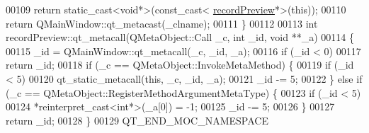 \begin{DoxyCode}
00109         \textcolor{keywordflow}{return} \textcolor{keyword}{static\_cast<}\textcolor{keywordtype}{void}*\textcolor{keyword}{>}(\textcolor{keyword}{const\_cast<} \hyperlink{a00020}{recordPreview}*\textcolor{keyword}{>}(\textcolor{keyword}{this}));
00110     \textcolor{keywordflow}{return} QMainWindow::qt\_metacast(\_clname);
00111 \}
00112 
00113 \textcolor{keywordtype}{int} recordPreview::qt\_metacall(QMetaObject::Call \_c, \textcolor{keywordtype}{int} \_id, \textcolor{keywordtype}{void} **\_a)
00114 \{
00115     \_id = QMainWindow::qt\_metacall(\_c, \_id, \_a);
00116     \textcolor{keywordflow}{if} (\_id < 0)
00117         \textcolor{keywordflow}{return} \_id;
00118     \textcolor{keywordflow}{if} (\_c == QMetaObject::InvokeMetaMethod) \{
00119         \textcolor{keywordflow}{if} (\_id < 5)
00120             qt\_static\_metacall(\textcolor{keyword}{this}, \_c, \_id, \_a);
00121         \_id -= 5;
00122     \} \textcolor{keywordflow}{else} \textcolor{keywordflow}{if} (\_c == QMetaObject::RegisterMethodArgumentMetaType) \{
00123         \textcolor{keywordflow}{if} (\_id < 5)
00124             *\textcolor{keyword}{reinterpret\_cast<}\textcolor{keywordtype}{int}*\textcolor{keyword}{>}(\_a[0]) = -1;
00125         \_id -= 5;
00126     \}
00127     \textcolor{keywordflow}{return} \_id;
00128 \}
00129 QT\_END\_MOC\_NAMESPACE
\end{DoxyCode}
